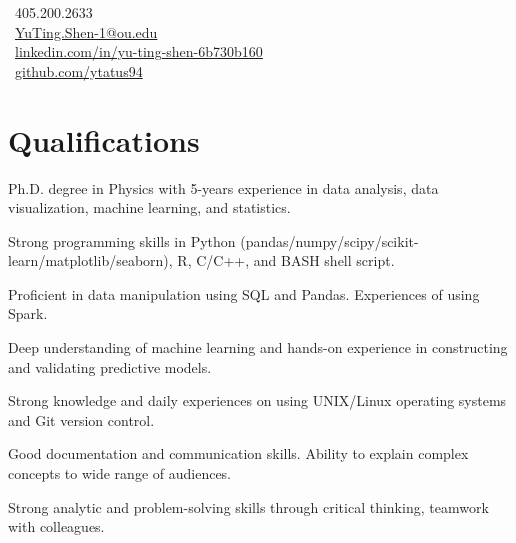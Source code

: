 \documentclass[letterpaper]{deedy-resume-openfont}
\begin{document}
%
%
\lastupdated

%
%

{
    \faPhone \ 405.200.2633\\
    \faEnvelope \ \href{mailto:YuTing.Shen-1@ou.edu}{YuTing.Shen-1@ou.edu}\\
    \faLinkedinSquare \ \href{https://www.linkedin.com/in/yu-ting-shen-6b730b160/}{linkedin.com/in/yu-ting-shen-6b730b160}\\
    \faGithub \ \href{https://github.com/ytatus94}{github.com/ytatus94}
}


\vspace{-0.3cm}

\section{Qualifications}
\location{}
\vspace{-0.4cm}
\begin{tightemize}
\item Ph.D. degree in Physics with 5-years experience in data analysis, data visualization, machine learning, and statistics.
\item Strong programming skills in Python (pandas/numpy/scipy/scikit-learn/matplotlib/seaborn), R,  C/C++, and BASH shell script.
\item Proficient in data manipulation using SQL and Pandas.
Experiences of using Spark.
\item Deep understanding of machine learning and hands-on experience in constructing and validating predictive models.
\item Strong knowledge and daily experiences on using UNIX/Linux operating systems and Git version control.
\item Good documentation and communication skills.
Ability to explain complex concepts to wide range of audiences.
\item Strong analytic and problem-solving skills through critical thinking, teamwork with colleagues.
\end{tightemize}
\end{document}
